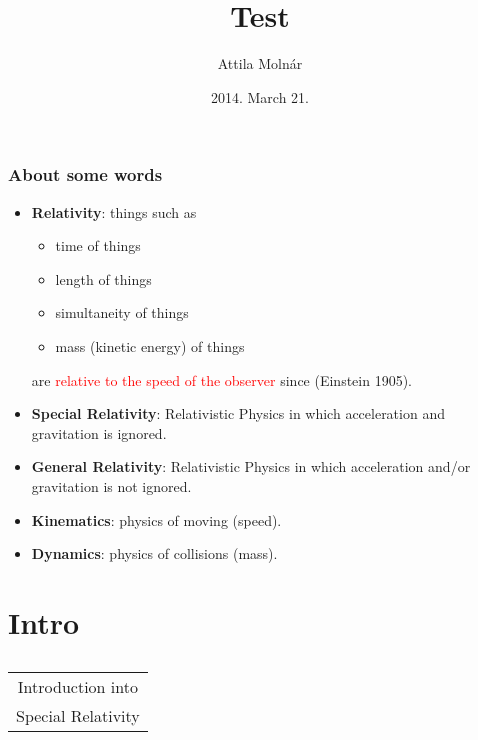\documentclass[xcolor=x11names]{beamer}
\author{Attila Moln\'ar}
\date{2014. March 21.}
\title{Test}
\institute{ELTE}
\makeatletter
\let\beamer@writeslidentry@miniframeson=\beamer@writeslidentry
\def\beamer@writeslidentry@miniframesoff{%
  \expandafter\beamer@ifempty\expandafter{\beamer@framestartpage}{}%
  {%
    \clearpage\beamer@notesactions%
  }
}
\newcommand*{\miniframeson}{\let\beamer@writeslidentry=\beamer@writeslidentry@miniframeson}
\newcommand*{\miniframesoff}{\let\beamer@writeslidentry=\beamer@writeslidentry@miniframesoff}
\newcommand{\cimdia}[1] {\miniframesoff \begin{frame}\begin{center}\huge \begin{tabular}{c}#1\end{tabular}\end{center}\end{frame}\miniframeson}
\newcommand{\szakasz}[2][]{\section{#1}\subsection{}\cimdia{#2}}
\newcommand{\cemph}[1]{\textcolor{red}{#1}}
\makeatother
\begin{document}
\footnotesize



\begin{frame}
\frametitle{About some words}
\begin{itemize}
\item \textbf{Relativity}: things such as
 \begin{itemize}\footnotesize
 \item time of things
 \item length of things
 \item simultaneity of things
 \item mass (kinetic energy) of things
 \end{itemize}
 are \cemph{relative to the speed of the observer} since (Einstein 1905).
\item \textbf{Special Relativity}: Relativistic Physics in which acceleration and gravitation is ignored.
\item \textbf{General Relativity}: Relativistic Physics in which acceleration and/or gravitation is not ignored.
\item \textbf{Kinematics}: physics of moving (speed).
\item \textbf{Dynamics}: physics of collisions (mass).
\end{itemize}

\end{frame}
\szakasz[Intro]{Introduction into \\ Special Relativity}
\end{document}
